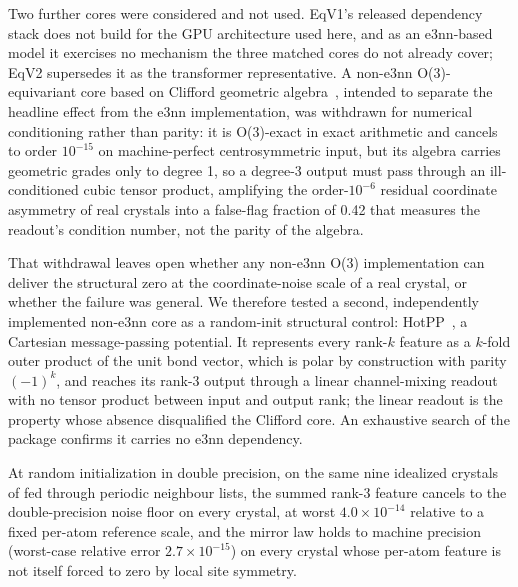 Two further cores were considered and not used. EqV1's released dependency stack does not build for the GPU architecture used here, and as an e3nn-based model it exercises no mechanism the three matched cores do not already cover; EqV2 supersedes it as the transformer representative. A non-e3nn O(3)-equivariant core based on Clifford geometric algebra~\cite{polat2026cliffordstf}, intended to separate the headline effect from the e3nn implementation, was withdrawn for numerical conditioning rather than parity: it is O(3)-exact in exact arithmetic and cancels to order $10^{-15}$ on machine-perfect centrosymmetric input, but its algebra carries geometric grades only to degree 1, so a degree-3 output must pass through an ill-conditioned cubic tensor product, amplifying the order-$10^{-6}$ residual coordinate asymmetry of real crystals into a false-flag fraction of 0.42 that measures the readout's condition number, not the parity of the algebra.

That withdrawal leaves open whether any non-e3nn O(3) implementation can deliver the structural zero at the coordinate-noise scale of a real crystal, or whether the failure was general. We therefore tested a second, independently implemented non-e3nn core as a random-init structural control: HotPP~\cite{wang2024hotpp}, a Cartesian message-passing potential. It represents every rank-$k$ feature as a $k$-fold outer product of the unit bond vector, which is polar by construction with parity $(-1)^k$, and reaches its rank-3 output through a linear channel-mixing readout with no tensor product between input and output rank; the linear readout is the property whose absence disqualified the Clifford core. An exhaustive search of the package confirms it carries no e3nn dependency.

At random initialization in double precision, on the same nine idealized crystals of  fed through periodic neighbour lists, the summed rank-3 feature cancels to the double-precision noise floor on every crystal, at worst $4.0\times10^{-14}$ relative to a fixed per-atom reference scale, and the mirror law holds to machine precision (worst-case relative error $2.7\times10^{-15}$) on every crystal whose per-atom feature is not itself forced to zero by local site symmetry.

